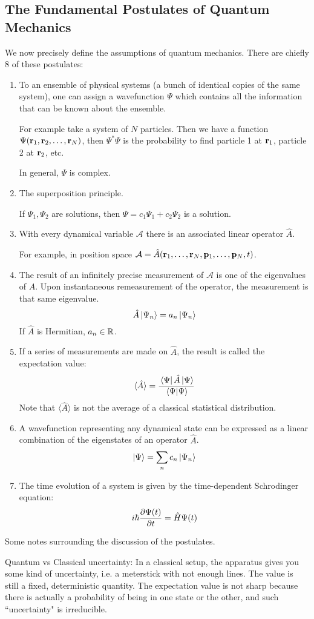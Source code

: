 \subsection{The Fundamental Postulates of Quantum Mechanics}
We now precisely define the assumptions of quantum mechanics. There are chiefly
8 of these postulates:
\begin{enumerate}
    \item To an ensemble of physical systems (a bunch of identical copies of the same system),
    one can assign a wavefunction $\Psi$ which contains all the information that can be known about the ensemble.

    For example take a system of $N$ particles. Then we have a function $\Psi(\mathbf{r}_1, \mathbf{r}_2, \dots, \mathbf{r}_N)$,
    then $\Psi^* \Psi$ is the probability to find particle 1 at $\mathbf{r}_1$, particle 2 at $\mathbf{r}_2$, etc.

    In general, $\Psi$ is complex.
    \item The superposition principle.
    
    If $\Psi_1, \Psi_2$ are solutions, then $\Psi = c_1 \Psi_1 + c_2 \Psi_2$ is a solution.
    \item With every dynamical variable $\mathcal{A}$ there is an associated linear operator $\hat{A}$.
    
    For example, in position space $\mathcal{A} = \hat{A}(\mathbf{r}_1, \dots, \mathbf{r}_{N}, \mathbf{p}_1, \dots, \mathbf{p}_N, t)$.
    \item The result of an infinitely precise measurement of $\mathcal{A}$ is one of the eigenvalues of $\hat{A}$. Upon
    instantaneous remeasurement of the operator, the measurement is that same eigenvalue.
    \[ \hat{A} \ket*{\Psi_n} = a_n \ket*{\Psi_n} \]
    If $\hat{A}$ is Hermitian, $a_n \in \operatorname{\mathbb{R}}$.
    \item If a series of measurements are made on $\hat{A}$, the result is called the expectation value:
    \[ \langle \hat{A} \rangle = \frac{\bra*{\Psi} \hat{A} \ket*{\Psi}}{\bra*{\Psi}\ket*{\Psi}} \]
    Note that $\langle \hat{A} \rangle$ is not the average of a classical statistical distribution.
    \item A wavefunction representing any dynamical state can be expressed as a linear combination of the eigenstates of
    an operator $\hat{A}$.
    \[ \ket{\Psi} = \sum_n c_n \ket{\Psi_n} \]
    \item The time evolution of a system is given by the time-dependent Schrodinger equation:
    \[ i \hbar \partialderivative{\Psi(t)}{t} = \hat{H} \Psi(t) \]
\end{enumerate}
Some notes surrounding the discussion of the postulates.

Quantum vs Classical uncertainty: In a classical setup, the apparatus gives
you some kind of uncertainty, i.e. a meterstick with not enough lines. The value is
still a fixed, deterministic quantity.
The expectation value is not sharp because there is actually a probability of being in one state or the other,
and such ``uncertainty" is irreducible.